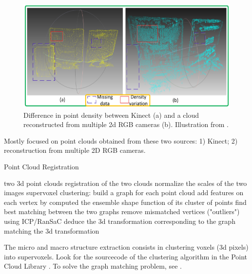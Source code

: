 \documentclass[11pt]{article} %
\begin{document}
\begin{figure}
  \centering
  \includegraphics[width= \linewidth]{kinect.png}
  \caption{Difference in point density between Kinect (a) and a cloud reconstructed from multiple 2d RGB cameras (b). Illustration from \cite{huang:kinect}.}
  \label{fig:kinect}
\end{figure}

Mostly focused on point clouds obtained from these two sources: 1) Kinect; 2) reconstruction from multiple 2D RGB cameras.
\begin{algorithm}
\caption{Point Cloud Registration \cite{huang:kinect}}
\label{algo:kinect}
\begin{algorithmic}
  \REQUIRE two 3d point clouds
  \ENSURE registration of the two clouds
  \STATE normalize the scales of the two images
  \STATE supervoxel clustering: build a graph for each point cloud
  \STATE add features on each vertex by computed the ensemble shape function of its cluster of points
  \STATE find best matching between the two graphs
  \STATE remove mismatched vertices ("outliers") using ICP/RanSaC
  \STATE deduce the 3d transformation corresponding to the graph matching
  \RETURN the 3d transformation
\end{algorithmic}
\end{algorithm}

The micro and macro structure extraction consists in clustering voxels (3d pixels) into supervoxels. Look for the sourcecode of the clustering algorithm in the Point Cloud Library \cite{rusu:pclib}.
To solve the graph matching problem, see \cite{zhou:graphmatching, cour:graphmatching, zaslavskiy:graphmatching, frank:quadratic, gertz:ooqp}.
\end{document}
